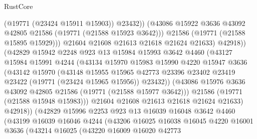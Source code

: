 \begin{lexlean}{RustCore}
\begin{coremodule}
                              (@19771 (@23424 @15911 @15903))
                              @23432))
                          (@43086 @15922 @3636 @43092 @42805 @21586 (@19771 (@21588 @15923 @3642)))
                          @21586
                          (@19771 (@21588 @15895 @15929)))
                        @21604
                        @21608
                        @21613
                        @21618
                        @21624
                        @21633)
                      @42918))
                  (@42829
                    @15942
                    @2248
                    @923
                    @13
                    @15984
                    @15993
                    @3642
                    @4460
                    (@43127
                      @15984
                      @15991
                      @4244
                      (@43134
                        @15970
                        @15983
                        @15990
                        @4220
                        @15947
                        @3636
                        (@43142
                          @15970
                          (@43148
                            @15955
                            @15965
                            @42773
                            @23396
                            @23402
                            @23419
                            @23422
                            (@19771 (@23424 @15965 @15956))
                            @23432))
                        (@43086 @15976 @3636 @43092 @42805 @21586 (@19771 (@21588 @15977 @3642)))
                        @21586
                        (@19771 (@21588 @15948 @15983)))
                      @21604
                      @21608
                      @21613
                      @21618
                      @21624
                      @21633)
                    @42918))
                (@42829
                  @15996
                  @2253
                  @923
                  @13
                  @16039
                  @16048
                  @3642
                  @4460
                  (@43199
                    @16039
                    @16046
                    @4244
                    (@43206
                      @16025
                      @16038
                      @16045
                      @4220
                      @16001
                      @3636
                      (@43214
                        @16025
                        (@43220
                          @16009
                          @16020
                          @42773

\end{coremodule}
\end{lexlean}
